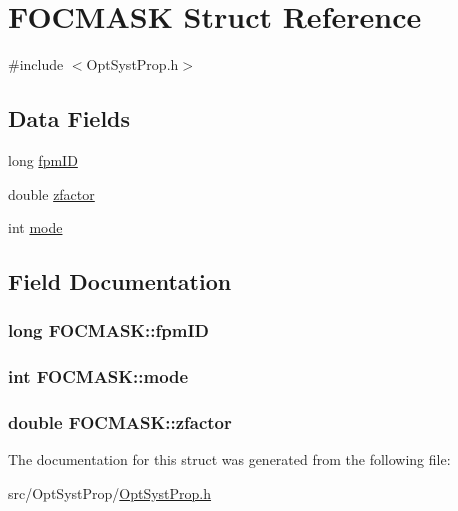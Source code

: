 \hypertarget{structFOCMASK}{\section{F\+O\+C\+M\+A\+S\+K Struct Reference}
\label{structFOCMASK}
}


{\ttfamily \#include $<$Opt\+Syst\+Prop.\+h$>$}

\subsection*{Data Fields}
\begin{DoxyCompactItemize}
\item 
long \hyperlink{structFOCMASK_aab678e43f6debad7a4699487249ef650}{fpm\+I\+D}
\item 
double \hyperlink{structFOCMASK_ae4f8bac28f3d485f900c7236b94a0aa2}{zfactor}
\item 
int \hyperlink{structFOCMASK_a16e3da16bad586e767f01533d4c64526}{mode}
\end{DoxyCompactItemize}


\subsection{Field Documentation}
\hypertarget{structFOCMASK_aab678e43f6debad7a4699487249ef650}{
\subsubsection[{fpm\+I\+D}]{\setlength{\rightskip}{0pt plus 5cm}long F\+O\+C\+M\+A\+S\+K\+::fpm\+I\+D}}\label{structFOCMASK_aab678e43f6debad7a4699487249ef650}
\hypertarget{structFOCMASK_a16e3da16bad586e767f01533d4c64526}{
\subsubsection[{mode}]{\setlength{\rightskip}{0pt plus 5cm}int F\+O\+C\+M\+A\+S\+K\+::mode}}\label{structFOCMASK_a16e3da16bad586e767f01533d4c64526}
\hypertarget{structFOCMASK_ae4f8bac28f3d485f900c7236b94a0aa2}{
\subsubsection[{zfactor}]{\setlength{\rightskip}{0pt plus 5cm}double F\+O\+C\+M\+A\+S\+K\+::zfactor}}\label{structFOCMASK_ae4f8bac28f3d485f900c7236b94a0aa2}


The documentation for this struct was generated from the following file\+:\begin{DoxyCompactItemize}
\item 
src/\+Opt\+Syst\+Prop/\hyperlink{OptSystProp_8h}{Opt\+Syst\+Prop.\+h}\end{DoxyCompactItemize}
